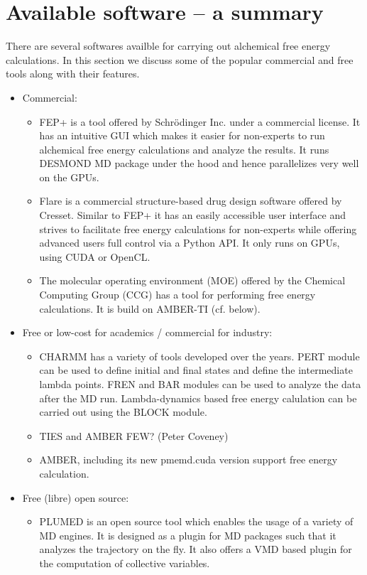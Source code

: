 \documentclass[9pt,bestpractices]{livecoms}
\begin{document}
\section{Available software -- a summary}
\label{sec:software}
There are several softwares availble for carrying out alchemical free energy calculations. In this section we discuss some of the popular commercial and free tools along with their features. 
\begin{itemize}
\item Commercial:
   \begin{itemize}
    \item FEP+ is a tool offered by Schr\"{o}dinger Inc. under a commercial license. It has an intuitive GUI which makes it easier for non-experts to run alchemical free energy calculations and analyze the results. It runs DESMOND MD package under the hood and hence parallelizes very well on the GPUs. 
    \item Flare is a commercial structure-based drug design software offered by Cresset. Similar to FEP+ it has an easily accessible user interface and strives to facilitate free energy calculations for non-experts while offering advanced users full control via a Python API. It only runs on GPUs, using CUDA or OpenCL.
    \item The molecular operating environment (MOE) offered by the Chemical Computing Group (CCG) has a tool for performing free energy calculations. It is build on AMBER-TI (cf. below).
    \end{itemize}
\item Free or low-cost for academics / commercial for industry:
	\begin{itemize}
	\item CHARMM has a variety of tools developed over the years. PERT module can be used to define initial and final states and define the intermediate lambda points. FREN and BAR modules can be used to analyze the data after the MD run. Lambda-dynamics based free energy calulation can be carried out using the BLOCK module.  
	\item TIES and AMBER FEW? (Peter Coveney)
	\item AMBER, including its new pmemd.cuda version support free energy calculation. 
	\end{itemize}
\item Free (libre) open source:
	\begin{itemize}
	\item PLUMED is an open source tool which enables the usage of a variety of MD engines. It is designed as a plugin for MD packages such that it analyzes the trajectory on the fly. It also offers a VMD based plugin for the computation of collective variables.   	

\end{itemize}
\end{itemize}
\end{document}
